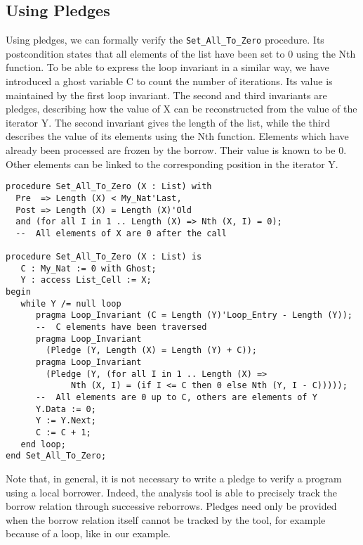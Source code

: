 \documentclass[runningheads]{llncs}
\begin{document}
\subsection{Using Pledges}
Using pledges, we can formally verify the \texttt{Set\_All\_To\_Zero} procedure. Its postcondition states that all elements of the list have been set to 0 using the Nth function. To be able to express the loop invariant in a similar way, we have introduced a ghost variable C to count the number of iterations. Its value is maintained by the first loop invariant. The second and third invariants are pledges, describing how the value of X can be reconstructed from the value of the iterator Y. The second invariant gives the length of the list, while the third describes the value of its elements using the Nth function. Elements which have already been processed are frozen by the borrow. Their value is known to be 0. Other elements can be linked to the corresponding position in the iterator Y. 
\begin{lstlisting}
procedure Set_All_To_Zero (X : List) with
  Pre  => Length (X) < My_Nat'Last,
  Post => Length (X) = Length (X)'Old
  and (for all I in 1 .. Length (X) => Nth (X, I) = 0);
  --  All elements of X are 0 after the call

procedure Set_All_To_Zero (X : List) is
   C : My_Nat := 0 with Ghost;
   Y : access List_Cell := X;
begin
   while Y /= null loop
      pragma Loop_Invariant (C = Length (Y)'Loop_Entry - Length (Y));
      --  C elements have been traversed
      pragma Loop_Invariant
        (Pledge (Y, Length (X) = Length (Y) + C));
      pragma Loop_Invariant
        (Pledge (Y, (for all I in 1 .. Length (X) =>
             Nth (X, I) = (if I <= C then 0 else Nth (Y, I - C)))));
      --  All elements are 0 up to C, others are elements of Y
      Y.Data := 0;
      Y := Y.Next;
      C := C + 1;
   end loop;
end Set_All_To_Zero;
\end{lstlisting}
Note that, in general, it is not necessary to write a pledge to verify a program using a local borrower. Indeed, the analysis tool is able to precisely track the borrow relation through successive reborrows. Pledges need only be provided when the borrow relation itself cannot be tracked by the tool, for example because of a loop, like in our example.
\end{document}

